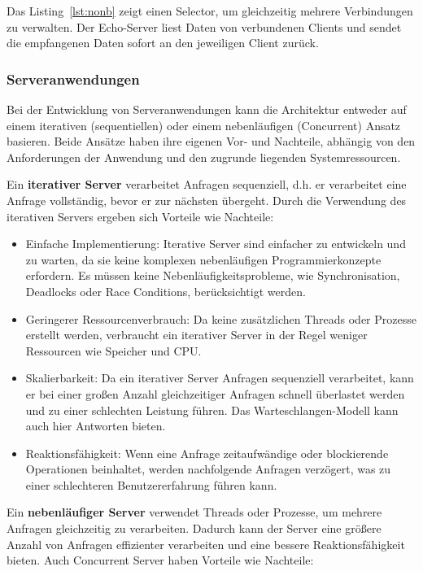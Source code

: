 \documentclass[../vs-script-first-v01.tex]{subfiles}
\begin{document}
Das Listing~\ref{lst:nonb} zeigt einen Selector, um gleichzeitig mehrere Verbindungen zu verwalten. Der Echo-Server liest Daten von verbundenen Clients und sendet die empfangenen Daten sofort an den jeweiligen Client zurück.

\subsubsection{Serveranwendungen}
Bei der Entwicklung von Serveranwendungen kann die Architektur entweder auf einem iterativen (sequentiellen) oder einem nebenläufigen (Concurrent) Ansatz basieren. Beide Ansätze haben ihre eigenen Vor- und Nachteile, abhängig von den Anforderungen der Anwendung und den zugrunde liegenden Systemressourcen. 

Ein \textbf{iterativer Server} verarbeitet Anfragen sequenziell, d.h. er verarbeitet eine Anfrage vollständig, bevor er zur nächsten übergeht.  Durch die Verwendung des iterativen Servers ergeben sich Vorteile wie Nachteile:
\begin{itemize}
\item Einfache Implementierung: Iterative Server sind einfacher zu entwickeln und zu warten, da sie keine komplexen nebenläufigen Programmierkonzepte erfordern. Es müssen keine Nebenläufigkeitsprobleme, wie Synchronisation, Deadlocks oder Race Conditions, berücksichtigt werden.
\item Geringerer Ressourcenverbrauch: Da keine zusätzlichen Threads oder Prozesse erstellt werden, verbraucht ein iterativer Server in der Regel weniger Ressourcen wie Speicher und CPU.
\item Skalierbarkeit: Da ein iterativer Server Anfragen sequenziell verarbeitet, kann er bei einer großen Anzahl gleichzeitiger Anfragen schnell überlastet werden und zu einer schlechten Leistung führen. Das Warteschlangen-Modell kann auch hier Antworten bieten.
\item Reaktionsfähigkeit: Wenn eine Anfrage zeitaufwändige oder blockierende Operationen beinhaltet, werden nachfolgende Anfragen verzögert, was zu einer schlechteren Benutzererfahrung führen kann.
\end{itemize}
Ein \textbf{nebenläufiger Server} verwendet Threads oder Prozesse, um mehrere Anfragen gleichzeitig zu verarbeiten. Dadurch kann der Server eine größere Anzahl von Anfragen effizienter verarbeiten und eine bessere Reaktionsfähigkeit bieten. Auch Concurrent Server haben Vorteile wie Nachteile:
\end{document}
